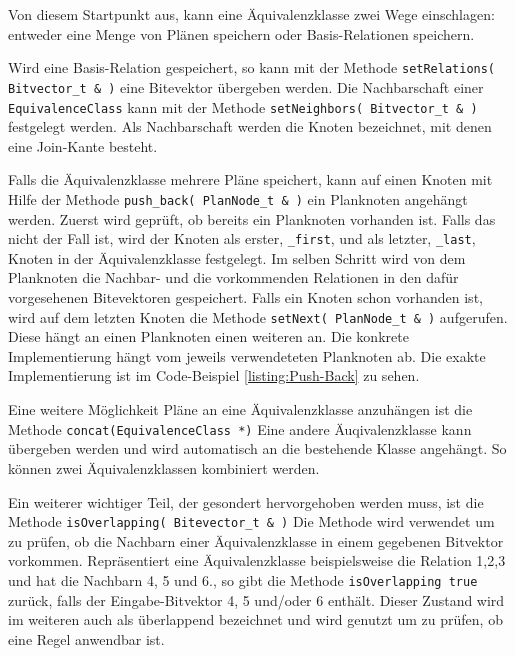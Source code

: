 Von diesem Startpunkt aus, kann eine Äquivalenzklasse zwei Wege einschlagen: entweder eine Menge von Plänen speichern oder Basis-Relationen speichern. 

Wird eine Basis-Relation gespeichert, so kann mit der Methode \texttt{setRelations( Bitvector\_t \& )} eine Bitevektor übergeben werden. Die Nachbarschaft einer \texttt{Equi\-valence\-Class} kann mit der Methode \texttt{setNeighbors( Bitvector\_t \& )} festgelegt werden. Als Nachbarschaft werden die Knoten bezeichnet, mit denen eine Join-Kante besteht.




Falls die Äquivalenzklasse mehrere Pläne speichert, kann auf einen Knoten mit Hilfe der Methode \texttt{push\_back( PlanNode\_t \& )} ein Planknoten angehängt werden. Zuerst wird geprüft, ob bereits ein Planknoten vorhanden ist. Falls das nicht der Fall ist, wird der Knoten als erster, \texttt{\_first}, und als letzter, \texttt{\_last}, Knoten in der Äquivalenzklasse festgelegt. Im selben Schritt wird von dem Planknoten die Nachbar- und die vorkommenden Relationen in den dafür vorgesehenen Bitevektoren gespeichert. Falls ein Knoten schon vorhanden ist, wird auf dem letzten Knoten die Methode \texttt{setNext( PlanNode\_t \& )} aufgerufen. Diese hängt an einen Planknoten einen weiteren an. Die konkrete Implementierung hängt vom jeweils verwendeteten Planknoten ab. Die exakte Implementierung ist im Code-Beispiel \ref{listing:Push-Back} zu sehen.



Eine weitere Möglichkeit Pläne an eine Äquivalenzklasse anzuhängen ist die Methode \texttt{concat(EquivalenceClass *)} Eine andere Äuqivalenzklasse kann übergeben werden und wird automatisch an die bestehende Klasse angehängt. So können zwei Äquivalenzklassen kombiniert werden.



Ein weiterer wichtiger Teil, der gesondert hervorgehoben werden muss, ist die Methode \texttt{isOverlapping( Bitevector\_t \& )} Die Methode wird  verwendet um zu prüfen, ob die Nachbarn einer Äquivalenzklasse in einem gegebenen Bitvektor vorkommen. Repräsentiert eine Äquivalenzklasse beispielsweise die Relation 1,2,3 und hat die Nachbarn 4, 5 und 6., so gibt die Methode \texttt{isOverlapping true} zurück, falls der Eingabe-Bitvektor 4, 5 und/oder 6 enthält. Dieser Zustand wird im weiteren auch als überlappend bezeichnet und wird genutzt um zu prüfen, ob eine Regel anwendbar ist.

